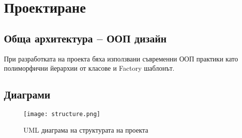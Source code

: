 \graphicspath{ {./chapter3/images/} }

\chapter{Проектиране}


\section{Обща архитектура – ООП дизайн}

При разработката на проекта бяха използвани съвременни ООП практики като
полиморфични йерархии от класове и Factory шаблонът.


\section{Диаграми}

\begin{figure}[h]
	\centering
	\texttt{[image: structure.png]}
	\caption{UML диаграма на структурата на проекта}
\end{figure}

